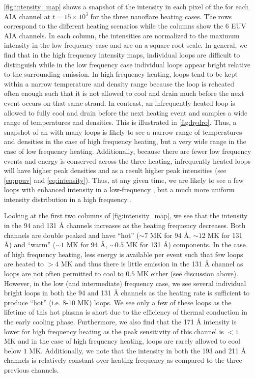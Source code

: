 \autoref{fig:intensity_map} shows a snapshot of the intensity in each pixel of the \AR{} for each AIA channel at $t=15\times10^3$ for the three nanoflare heating cases. The rows correspond to the different heating scenarios while the columns show the 6 EUV AIA channels. In each column, the intensities are normalized to the maximum intensity in the low frequency case and are on a square root scale. In general, we find that in the high frequency intensity maps, individual loops are difficult to distinguish while in the low frequency case individual loops appear bright relative to the surrounding emission. In high frequency heating, loops tend to be kept within a narrow temperature and density range because the loop is reheated often enough such that it is not allowed to cool and drain much before the next event occurs on that same strand. In contrast, an infrequently heated loop is allowed to fully cool and drain before the next heating event and samples a wide range of temperatures and densities. This is illustrated in \autoref{fig:hydro}. Thus, a snapshot of an \AR{} with many loops is likely to see a narrow range of temperatures and densities in the case of high frequency heating, but a very wide range in the case of low frequency heating. Additionally, because there are fewer low frequency events and energy is conserved across the three heating, infrequently heated loops will have higher peak densities and as a result higher peak intensities (see \autoref{eq:ppuv} and \ref{eq:intensity}). Thus, at any given time, we are likely to see a few loops with enhanced intensity in a low-frequency \AR{}, but a much more uniform intensity distribution in a high frequency \AR{}.

Looking at the first two columns of \autoref{fig:intensity_map}, we see that the intensity in the 94 and 131 \AA{} channels increases as the heating frequency decreases. Both channels are double peaked and have ``hot'' ($\sim7$ MK for 94 \AA{}, $\sim12$ MK for 131 \AA{}) and ``warm'' ($\sim1$ MK for 94 \AA{}, $\sim0.5$ MK for 131 \AA{}) components. In the case of high frequency heating, less energy is available per event such that few loops are heated to $>4$ MK and thus there is little emission in the 131 \AA{} channel as loops are not often permitted to cool to $0.5$ MK either (see discussion above). However, in the low (and intermediate) frequency case, we see several individual bright loops in both the 94 and 131 \AA{} channels as the heating rate is sufficient to produce ``hot'' (i.e. 8-10 MK) loops. We see only a few of these loops as the lifetime of this hot plasma is short due to the efficiency of thermal conduction in the early cooling phase. Furthermore, we also find that the 171 \AA{} intensity is lower for high frequency heating as the peak sensitivity of this channel is $<1$ MK and in the case of high frequency heating, loops are rarely allowed to cool below $1$ MK. Additionally, we note that the intensity in both the 193 and 211 \AA{} channels is relatively constant over heating frequency as compared to the three previous channels.  

